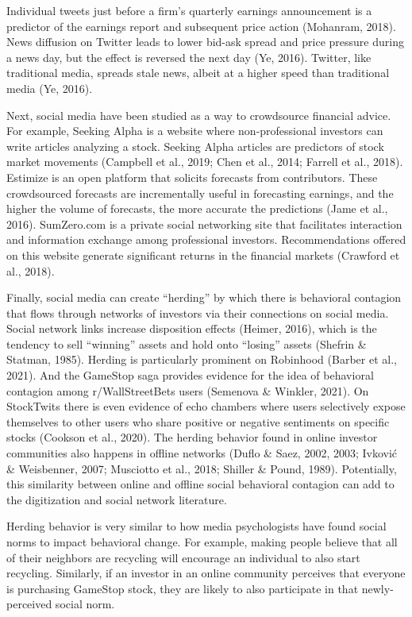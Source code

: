 \documentclass[12pt,]{article}
\begin{document}
Individual tweets just before a firm's quarterly earnings announcement
is a predictor of the earnings report and subsequent price action
(Mohanram, 2018). News diffusion on Twitter leads to lower bid-ask
spread and price pressure during a news day, but the effect is reversed
the next day (Ye, 2016). Twitter, like traditional media, spreads stale
news, albeit at a higher speed than traditional media (Ye, 2016).

Next, social media have been studied as a way to crowdsource financial
advice. For example, Seeking Alpha is a website where non-professional
investors can write articles analyzing a stock. Seeking Alpha articles
are predictors of stock market movements (Campbell et al., 2019; Chen et
al., 2014; Farrell et al., 2018). Estimize is an open platform that
solicits forecasts from contributors. These crowdsourced forecasts are
incrementally useful in forecasting earnings, and the higher the volume
of forecasts, the more accurate the predictions (Jame et al., 2016).
SumZero.com is a private social networking site that facilitates
interaction and information exchange among professional investors.
Recommendations offered on this website generate significant returns in
the financial markets (Crawford et al., 2018).

Finally, social media can create ``herding'' by which there is
behavioral contagion that flows through networks of investors via their
connections on social media. Social network links increase disposition
effects (Heimer, 2016), which is the tendency to sell ``winning'' assets
and hold onto ``losing'' assets (Shefrin \& Statman, 1985). Herding is
particularly prominent on Robinhood (Barber et al., 2021). And the
GameStop saga provides evidence for the idea of behavioral contagion
among r/WallStreetBets users (Semenova \& Winkler, 2021). On StockTwits
there is even evidence of echo chambers where users selectively expose
themselves to other users who share positive or negative sentiments on
specific stocks (Cookson et al., 2020). The herding behavior found in
online investor communities also happens in offline networks (Duflo \&
Saez, 2002, 2003; Ivković \& Weisbenner, 2007; Musciotto et al., 2018;
Shiller \& Pound, 1989). Potentially, this similarity between online and
offline social behavioral contagion can add to the digitization and
social network literature.

Herding behavior is very similar to how media psychologists have found
social norms to impact behavioral change. For example, making people
believe that all of their neighbors are recycling will encourage an
individual to also start recycling. Similarly, if an investor in an
online community perceives that everyone is purchasing GameStop stock,
they are likely to also participate in that newly-perceived social norm.
\end{document}
